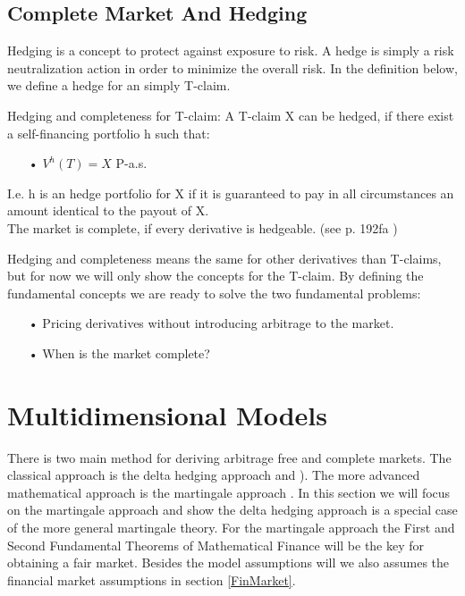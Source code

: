 
\subsection{Complete Market And Hedging}
Hedging is a concept to protect against exposure to risk. A hedge is simply a risk neutralization action in order to minimize the overall risk. In the definition below, we define a hedge for an simply T-claim.
\theoremstyle{definition}
\begin{definition}{Hedging and completeness for T-claim:}
A T-claim X can be hedged, if there exist a self-financing portfolio h such that:
\begin{enumerate}
\item[•] $V^{h}(T)=X$ P-a.s.
\end{enumerate}
I.e. h is an hedge portfolio for X if it is guaranteed to pay in all circumstances an amount identical to the payout of X.\\
The market is complete, if every derivative is hedgeable.
(see p. 192fa \parencite{finKont})
\end{definition}
Hedging and completeness means the same for other derivatives than T-claims, but for now we will only show the concepts for the T-claim. By defining the fundamental concepts we are ready to solve the two fundamental problems:
\begin{enumerate}
\item[•] Pricing derivatives without introducing arbitrage to the market.
\item[•] When is the market complete?
\end{enumerate}


\section{Multidimensional Models}\label{MultiDimModel}
There is two main method for deriving arbitrage free and complete markets. The classical approach is the delta hedging approach \parencite{B-S-Paper} and \parencite{CRR}). The more advanced mathematical approach is the martingale approach  \parencite{finKont}. In this section we will focus on the martingale approach and show the delta hedging approach is a special case of the more general martingale theory. For the martingale approach the First and Second Fundamental Theorems of Mathematical Finance will be the key for obtaining a fair market. Besides the model assumptions will we also assumes the financial market assumptions in section \ref{FinMarket}.

